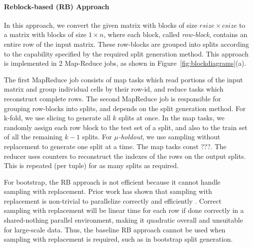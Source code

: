 \documentclass{vldb}
\newcommand{\eat}[1]{} %
\begin{document}
\paragraph*{Reblock-based (RB) Approach}
In this approach, we convert the given matrix with blocks of size $rsize \times csize$
to a matrix with blocks of size $1 \times n$, where each block, called \emph{row-block},
contains an entire row of the input matrix. These row-blocks are grouped into splits
according to the capability specified by the required split generation method.
This approach is implemented in 2 Map-Reduce jobs, as shown in Figure~\ref{fig:blockdiagrams}(a).

The first MapReduce job consists of map tasks which read portions of the input matrix and
group individual cells by their row-id, and reduce tasks which reconstruct complete rows.
The second MapReduce job is responsible for grouping row-blocks into splits,
and depends on the split generation method.
For k-fold, we use slicing to generate all $k$ splits at once.
In the map tasks, we randomly assign each row block to the test set of a split,
and also to the train set of all the remaining $k-1$ splits.
For \textit{$\mu$-holdout}, we use sampling without replacement
to generate one split at a time.
 The map tasks const ???.
The reducer uses counters to reconstruct the indexes of the rows on the output splits.
This is repeated (per tuple) for as many splits as required.

For bootstrap, the RB approach is not efficient because it cannot handle sampling with replacement.
Prior work has shown that sampling with replacement is non-trivial to parallelize correctly and efficiently
\cite{planet}.
Correct sampling with replacement will be linear time for each row if done correctly in
a shared-nothing parallel environment, making it quadratic overall and unsuitable for large-scale data.
Thus, the baseline RB approach cannot be used when sampling with replacement is required,
such as in bootstrap split generation.

\eat{
Since each tuple is operated on independently during the partitioning job, the RB
approach runs overall in linear time (in the amount of data).
However, this approach cannot efficiently handle sampling with replacement, which is
required for bootstrap split generation.
Prior work has shown sampling with replacement is non-trivial to parallelize correctly and efficiently
\cite{planet}.
Correct sampling with replacement will be linear time for each row if done correctly in parallel,
making it quadratic overall and unsuitable for large-scale data.
Thus, the baseline RB approach cannot be used when sampling with replacement is required.
}
\end{document}
